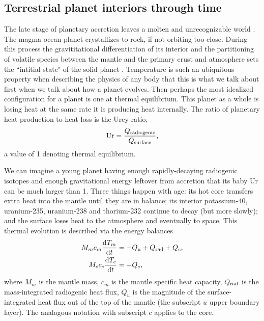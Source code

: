 \subsection{Terrestrial planet interiors through time}

The late stage of planetary accretion leaves a molten and unrecognizable world \citep{Elkins-Tanton2012}. The magma ocean planet crystallizes to rock, if not orbiting too close. During this process the gravititational differentiation of its interior and the partitioning of volatile species between the mantle and the primary crust and atmosphere sets the ``intitial state" of the solid planet \citep{Tosi2019}. %
Temperature is such an ubiquitous property when describing the physics of any body that this is what we talk about first when we talk about how a planet evolves. Then perhaps the most idealized configuration for a planet is one at thermal equilibrium. This planet as a whole is losing heat at the same rate it is producing heat internally. The ratio of planetary heat production to heat loss is the Urey ratio,
\begin{align}\label{eq:Ur}
{\rm Ur} = \frac{Q_{\rm radiogenic}}{Q_{\rm surface}},
\end{align}
a value of 1 denoting thermal equilibrium.

We can imagine a young planet having enough rapidly-decaying radiogenic isotopes and enough gravitational energy leftover from accretion that its baby Ur can be much larger than 1. Three things happen with age: its hot core transfers extra heat into the mantle until they are in balance; its interior potassium-40, uranium-235, uranium-238 and thorium-232 continue to decay (but more slowly); and the surface loses heat to the atmosphere and eventually to space. This thermal evolution is described via the energy balances
\begin{align}\label{eq:T_ODE}
\begin{split}
M_m c_{m} \frac{{\rm d}T_m}{{\rm d}t} &= -Q_{\rm u} + Q_{\rm rad} + Q_c, \\
M_c c_{c} \frac{{\rm d}T_c}{{\rm d}t} &= -Q_c,
\end{split}
\end{align}
where $M_m$ is the mantle mass, $c_{m}$ is the mantle specific heat capacity, $Q_{\rm rad}$ is the mass-integrated radiogenic heat flux, $Q_{u}$ is the magnitude of the surface-integrated heat flux out of the top of the mantle (the subscript $u$ upper boundary layer). The analagous notation with subscript $c$ applies to the core. 

